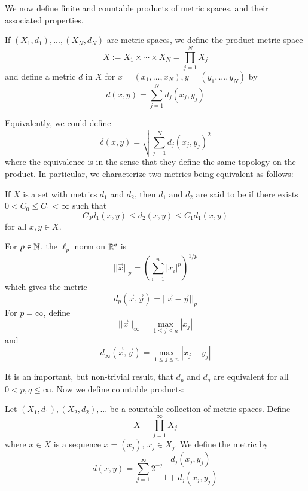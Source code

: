 We now define finite and countable products of metric spaces, and their associated properties.

\begin{defn}
    If $(X_1,d_1),...,(X_N,d_N)$ are metric spaces, we define the product metric space \begin{equation*}
        X := X_1\times \cdots \times X_N = \prod_{j=1}^NX_j
    \end{equation*}
    and define a metric $d$ in $X$ for $x = (x_1,...,x_N),y = (y_1,...,y_N)$ by \begin{equation*}
        d(x,y) = \sum_{j=1}^Nd_j(x_j,y_j)
    \end{equation*}
\end{defn}
Equivalently, we could define \begin{equation*}
    \delta(x,y) = \sqrt{\sum_{j=1}^Nd_j(x_j,y_j)^2}
\end{equation*}
where the equivalence is in the sense that they define the same topology on the product. In particular, we characterize two metrics being equivalent as follows:

\begin{defn}
    If $X$ is a set with metrics $d_1$ and $d_2$, then $d_1$ and $d_2$ are said to be  if there exists $0 < C_0 \leq C_1 < \infty$ such that \begin{equation*}
        C_0d_1(x,y) \leq d_2(x,y) \leq C_1d_1(x,y)
    \end{equation*}
    for all $x,y \in X$.
\end{defn}

\begin{defn}
    For $p \in \mathbb N$, the $\ell_p$ norm on $\mathbb R^n$ is \begin{equation*}
        ||\vec{x}||_p = \left(\sum_{i=1}^n|x_i|^p\right)^{1/p}
    \end{equation*}
    which gives the metric $$d_p(\vec{x},\vec{y}) = ||\vec{x} - \vec{y}||_p$$ For $p = \infty$, define $$||\vec{x}||_{\infty} = \max_{1\leq j \leq n}|x_j|$$ and $$d_{\infty}(\vec{x},\vec{y}) = \max_{1\leq j \leq n}|x_j - y_j|$$
\end{defn}

It is an important, but non-trivial result, that $d_p$ and $d_q$ are equivalent for all $0 < p,q \leq \infty$. Now we define countable products:

\begin{defn}
    Let $(X_1,d_1),(X_2,d_2),...$ be a countable collection of metric spaces. Define $$X = \prod_{j=1}^{\infty}X_j$$ where $x \in X$ is a sequence $x = (x_j)$, $x_j \in X_j$. We define the metric by $$d(x,y) = \sum_{j=1}^{\infty}2^{-j}\frac{d_j(x_j,y_j)}{1+d_j(x_j,y_j)}$$
\end{defn}

